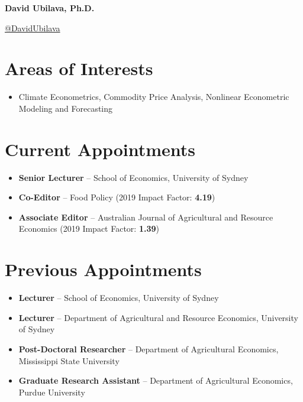 \documentclass[10pt]{article}
\begin{document}
	
	
	
	\hspace{0.38in}\Large{\bfseries{David Ubilava, Ph.D.}}
	
	\medskip
	
	\hspace{0.38in}\large{\href{https://twitter.com/DavidUbilava}{@DavidUbilava}}
	
	\normalsize
	
	
	\medskip

	
	
	\section*{Areas of Interests}
	\begin{itemize}
		\item Climate Econometrics, Commodity Price Analysis, Nonlinear Econometric Modeling and Forecasting
	\end{itemize}
	
	
	\section*{Current Appointments}
	\begin{itemize}
		\item {} \textbf{Senior Lecturer} -- School of Economics, University of Sydney
		\item {} \textbf{Co-Editor} -- Food Policy (2019 Impact Factor: \textbf{4.19})
		\item {} \textbf{Associate Editor} -- Australian Journal of Agricultural and Resource Economics (2019 Impact Factor: \textbf{1.39})
	\end{itemize}

	\section*{Previous Appointments}
	\begin{itemize}
		\item {} \textbf{Lecturer} -- School of Economics, University of Sydney
		\item {} \textbf{Lecturer} -- Department of Agricultural and Resource Economics, University of Sydney
		\item {} \textbf{Post-Doctoral Researcher} -- Department of Agricultural Economics, Mississippi State University
		\item {} \textbf{Graduate Research Assistant} -- Department of Agricultural Economics, Purdue University
	\end{itemize}
	
\end{document}
